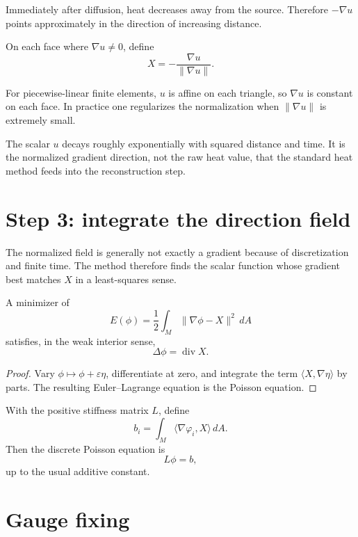 Immediately after diffusion, heat decreases away from the source.  Therefore
\(-\nabla u\) points approximately in the direction of increasing distance.

\begin{definition}\label{def:vii40-X}
On each face where \(\nabla u\ne0\), define
\[
X=-\frac{\nabla u}{\|\nabla u\|}.
\]
\end{definition}

For piecewise-linear finite elements, \(u\) is affine on each triangle, so
\(\nabla u\) is constant on each face.  In practice one regularizes the
normalization when \(\|\nabla u\|\) is extremely small.

\begin{warning}\label{warn:vii40-mag}
The scalar \(u\) decays roughly exponentially with squared distance and time.  It
is the normalized gradient direction, not the raw heat value, that the standard
heat method feeds into the reconstruction step.
\end{warning}

\section{Step 3: integrate the direction field}

The normalized field is generally not exactly a gradient because of
discretization and finite time.  The method therefore finds the scalar function
whose gradient best matches \(X\) in a least-squares sense.

\begin{theorem}\label{thm:vii40-poisson}
A minimizer of
\[
E(\phi)=\frac12\int_M\|\nabla\phi-X\|^2\,dA
\]
satisfies, in the weak interior sense,
\[
\Delta\phi=\operatorname{div}X.
\]
\end{theorem}

\begin{proof}
Vary \(\phi\mapsto\phi+\varepsilon\eta\), differentiate at zero, and integrate
the term \(\langle X,\nabla\eta\rangle\) by parts.  The resulting Euler--Lagrange
equation is the Poisson equation.
\end{proof}

With the positive stiffness matrix \(L\), define
\[
b_i=\int_M\langle\nabla\varphi_i,X\rangle\,dA.
\]
Then the discrete Poisson equation is
\[
L\phi=b,
\]
up to the usual additive constant.

\section{Gauge fixing}

